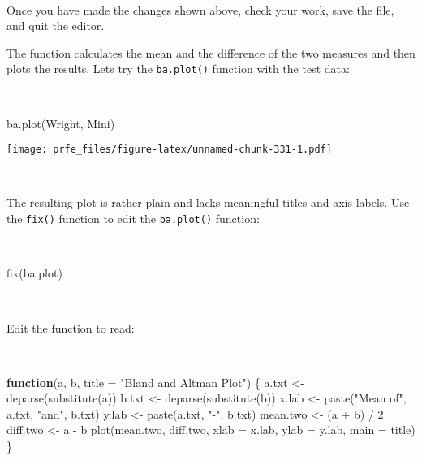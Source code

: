 \documentclass[
  12pt,
  a4paper]{book}
\newenvironment{Shaded}{\begin{snugshade}}{\end{snugshade}}
\newcommand{\AttributeTok}[1]{\textcolor[rgb]{0.77,0.63,0.00}{#1}}
\newcommand{\ControlFlowTok}[1]{\textcolor[rgb]{0.13,0.29,0.53}{\textbf{#1}}}
\newcommand{\DecValTok}[1]{\textcolor[rgb]{0.00,0.00,0.81}{#1}}
\newcommand{\FunctionTok}[1]{\textcolor[rgb]{0.00,0.00,0.00}{#1}}
\newcommand{\NormalTok}[1]{#1}
\newcommand{\OtherTok}[1]{\textcolor[rgb]{0.56,0.35,0.01}{#1}}
\newcommand{\SpecialCharTok}[1]{\textcolor[rgb]{0.00,0.00,0.00}{#1}}
\newcommand{\StringTok}[1]{\textcolor[rgb]{0.31,0.60,0.02}{#1}}
\begin{document}
~

Once you have made the changes shown above, check your work, save the file, and quit the editor.

The function calculates the mean and the difference of the two measures and then plots the results. Lets try the
\texttt{ba.plot()} function with the test data:

~

\begin{Shaded}
\begin{Highlighting}[]
\FunctionTok{ba.plot}\NormalTok{(Wright, Mini)}
\end{Highlighting}
\end{Shaded}

\texttt{[image: prfe\_files/figure-latex/unnamed-chunk-331-1.pdf]}

~

The resulting plot is rather plain and lacks meaningful titles and axis labels. Use the \texttt{fix()} function to edit the \texttt{ba.plot()} function:

~

\begin{Shaded}
\begin{Highlighting}[]
\FunctionTok{fix}\NormalTok{(ba.plot)}
\end{Highlighting}
\end{Shaded}

~

Edit the function to read:

~

\begin{Shaded}
\begin{Highlighting}[]
\ControlFlowTok{function}\NormalTok{(a, b, }\AttributeTok{title =} \StringTok{"Bland and Altman Plot"}\NormalTok{) \{}
\NormalTok{  a.txt }\OtherTok{\textless{}{-}} \FunctionTok{deparse}\NormalTok{(}\FunctionTok{substitute}\NormalTok{(a))}
\NormalTok{  b.txt }\OtherTok{\textless{}{-}} \FunctionTok{deparse}\NormalTok{(}\FunctionTok{substitute}\NormalTok{(b))}
\NormalTok{  x.lab }\OtherTok{\textless{}{-}} \FunctionTok{paste}\NormalTok{(}\StringTok{"Mean of"}\NormalTok{, a.txt, }\StringTok{"and"}\NormalTok{, b.txt)}
\NormalTok{  y.lab }\OtherTok{\textless{}{-}} \FunctionTok{paste}\NormalTok{(a.txt, }\StringTok{"{-}"}\NormalTok{, b.txt)}
\NormalTok{  mean.two }\OtherTok{\textless{}{-}}\NormalTok{ (a }\SpecialCharTok{+}\NormalTok{ b) }\SpecialCharTok{/} \DecValTok{2}
\NormalTok{  diff.two }\OtherTok{\textless{}{-}}\NormalTok{ a }\SpecialCharTok{{-}}\NormalTok{ b}
  \FunctionTok{plot}\NormalTok{(mean.two, diff.two, }\AttributeTok{xlab =}\NormalTok{ x.lab, }\AttributeTok{ylab =}\NormalTok{ y.lab, }\AttributeTok{main =}\NormalTok{ title)}
\NormalTok{\}}
\end{Highlighting}
\end{Shaded}
\end{document}
